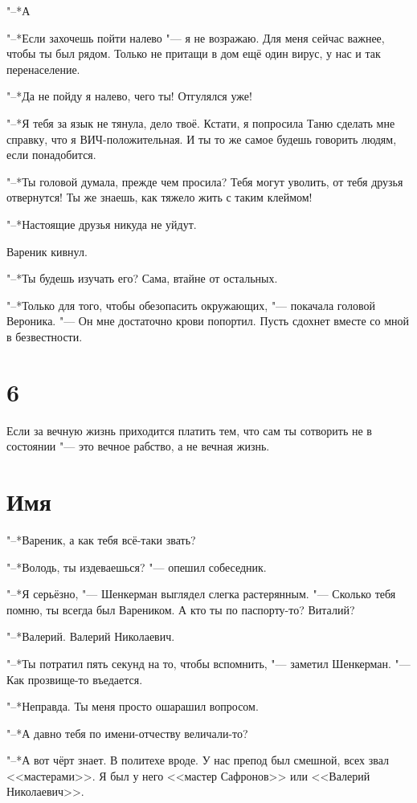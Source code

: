 "--*А\ldotst

"--*Если захочешь пойти налево "--- я не возражаю.
Для меня сейчас важнее, чтобы ты был рядом.
Только не притащи в дом ещё один вирус, у нас и так перенаселение.

"--*Да не пойду я налево, чего ты!
Отгулялся уже!

"--*Я тебя за язык не тянула, дело твоё.
Кстати, я попросила Таню сделать мне справку, что я ВИЧ-положительная.
И ты то же самое будешь говорить людям, если понадобится.

"--*Ты головой думала, прежде чем просила?
Тебя могут уволить, от тебя друзья отвернутся!
Ты же знаешь, как тяжело жить с таким клеймом!

"--*Настоящие друзья никуда не уйдут.

Вареник кивнул.

"--*Ты будешь изучать его?
Сама, втайне от остальных.

"--*Только для того, чтобы обезопасить окружающих, "--- покачала головой Вероника.
"--- Он мне достаточно крови попортил.
Пусть сдохнет вместе со мной в безвестности.

\section{6}

Если за вечную жизнь приходится платить тем, что сам ты сотворить не в состоянии "--- это вечное рабство, а не вечная жизнь.

\section{Имя}

"--*Вареник, а как тебя всё-таки звать?

"--*Володь, ты издеваешься? "--- опешил собеседник.

"--*Я серьёзно, "--- Шенкерман выглядел слегка растерянным.
"--- Сколько тебя помню, ты всегда был Вареником.
А кто ты по паспорту-то?
Виталий?

"--*Валерий.
Валерий Николаевич.

"--*Ты потратил пять секунд на то, чтобы вспомнить, "--- заметил Шенкерман. 
"--- Как прозвище-то въедается.

"--*Неправда.
Ты меня просто ошарашил вопросом.

"--*А давно тебя по имени-отчеству величали-то?

"--*А вот чёрт знает.
В политехе вроде.
У нас препод был смешной, всех звал <<мастерами>>.
Я был у него <<мастер Сафронов>> или <<Валерий Николаевич>>.

